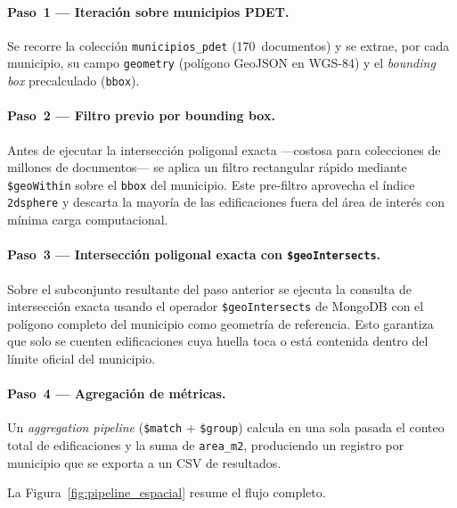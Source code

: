 \documentclass[12pt, a4paper]{report}
\begin{document}
\paragraph{Paso~1 — Iteración sobre municipios PDET.}
Se recorre la colección \texttt{municipios\_pdet} (170~documentos) y se
extrae, por cada municipio, su campo \texttt{geometry} (polígono GeoJSON
en WGS-84) y el \textit{bounding box} precalculado (\texttt{bbox}).

\paragraph{Paso~2 — Filtro previo por bounding box.}
Antes de ejecutar la intersección poligonal exacta —costosa para colecciones
de millones de documentos— se aplica un filtro rectangular rápido mediante
\texttt{\$geoWithin} sobre el \texttt{bbox} del municipio.
Este pre-filtro aprovecha el índice \texttt{2dsphere} y descarta la mayoría
de las edificaciones fuera del área de interés con mínima carga computacional.

\paragraph{Paso~3 — Intersección poligonal exacta con \texttt{\$geoIntersects}.}
Sobre el subconjunto resultante del paso anterior se ejecuta la consulta de
intersección exacta usando el operador \texttt{\$geoIntersects} de MongoDB
con el polígono completo del municipio como geometría de referencia.
Esto garantiza que solo se cuenten edificaciones cuya huella toca o está
contenida dentro del límite oficial del municipio.

\paragraph{Paso~4 — Agregación de métricas.}
Un \textit{aggregation pipeline} (\texttt{\$match} + \texttt{\$group})
calcula en una sola pasada el conteo total de edificaciones y la suma de
\texttt{area\_m2}, produciendo un registro por municipio que se exporta
a un CSV de resultados.

La Figura~\ref{fig:pipeline_espacial} resume el flujo completo.
\end{document}

